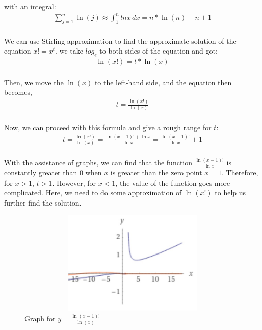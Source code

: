 \documentclass{article}
\begin{document}
        with an integral:\\
            \begin{align*}
                \sum^{n}_{j = 1} \ln(j) \approx  \int_{1}^{n} lnx \,dx = n * \ln(n) - n + 1
            \end{align*}\\
        
        We can use Stirling approximation to find the approximate solution of the equation $x! = x ^ {t}$.
        we take $log_e$ to both sides of the equation and got:
            \begin{align*}
                \ln(x!) = t * \ln(x)
            \end{align*}\\
        Then, we move the $\ln(x)$ to the left-hand side, and the equation then becomes,
            \begin{align*}
                t = \frac{\ln(x!)}{\ln(x)}
            \end{align*}\\
        Now, we can proceed with this formula and give a rough range for $t$:
        \begin{align*}
                t = \frac{\ln(x!)}{\ln(x)} = \frac{\ln{(x-1)!}+\ln x}{\ln x}=\frac{\ln{(x-1)!}}{\ln x}+1
        \end{align*}\\
        With the assistance of graphs, we can find that the function $\frac{\ln{(x-1)!}}{\ln x}$ is constantly greater than $0$ when $x$ is greater than the zero point $x=1$. Therefore, for $x>1$, $t>1$. However, for $x<1$, the value of the function goes more complicated. 
        Here, we need to do some approximation of $\ln(x!)$ to help us further find the solution.\\

        \begin{figure}[h]
        \centering
        \includegraphics[width=12cm, height = 5cm]{101.jpg}
        \caption{Graph for $y = \frac{\ln(x-1)!}{\ln(x)}$}
        \label{fig:picture}
        \end{figure}
\end{document}
